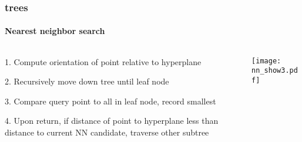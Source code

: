 \begin{frame}[noframenumbering]
  \frametitle{\kd trees}
  \framesubtitle{Nearest neighbor search}
  \begin{columns}[T]
    \begin{column}{.5\textwidth}
      \begin{block}{}%
        {\color{white} 1.\hspace{1mm} Compute orientation of point relative to hyperplane
          \\\vspace{0.4cm}

        {\color{graph-red}
        2.\hspace{1mm} Recursively move down tree until leaf node}\\\vspace{0.4cm}

        3.\hspace{1mm} Compare query point to all in leaf node, record smallest\\\vspace{0.4cm}
    
        4.\hspace{1mm} Upon return, if distance of point to hyperplane less than distance to current
          NN candidate, traverse other subtree}
      \end{block}
    \end{column}
    \begin{column}{.5\textwidth}
      \begin{block}{}
        \texttt{[image: nn\_show3.pdf]}
      \end{block}
    \end{column}
  \end{columns}
\end{frame}

